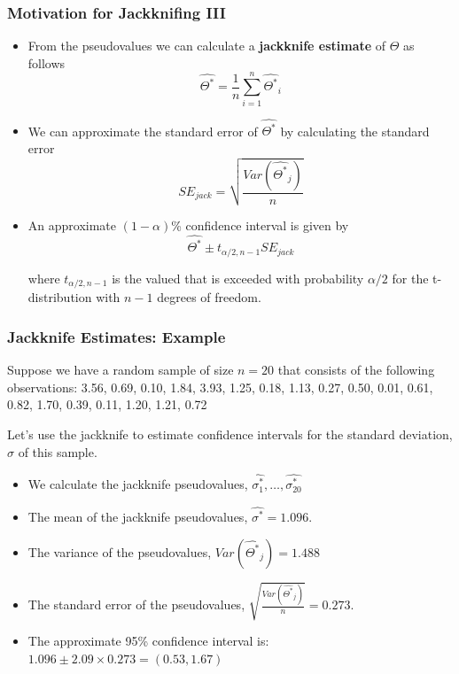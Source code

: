 \documentclass{beamer}
\begin{document}
\begin{frame}
  \frametitle{Motivation for Jackknifing III}

\begin{itemize}
    \item From the pseudovalues we can calculate a \textbf{jackknife estimate} of $\Theta$ as follows
\[
\widehat{\Theta^*} = \frac{1}{n} \sum_{i=1}^{n}\widehat{\Theta^*}_i
\]

    \item We can approximate the standard error of $\widehat{\Theta^*}$ by calculating the standard error
\[
SE_{jack} = \sqrt{\frac{Var(\widehat{\Theta^*}_j)}{n}}
\]


    \item An approximate $(1-\alpha)$\% confidence interval is given by
\[
\widehat{\Theta^*} \pm t_{\alpha/2, n-1} SE_{jack}
\]

where $t_{\alpha/2, n-1}$ is the valued that is exceeded with probability $\alpha/2$ for the t-distribution with $n-1$ degrees of freedom.

\end{itemize}

\end{frame}

\begin{frame}
  \frametitle{Jackknife Estimates: Example}

Suppose we have a random sample of size $n=20$ that consists of the following observations: 3.56, 0.69, 0.10, 1.84, 3.93, 1.25, 0.18, 1.13, 0.27, 0.50, 0.01, 0.61, 0.82, 1.70, 0.39, 0.11, 1.20, 1.21, 0.72
\medskip

Let's use the jackknife to estimate confidence intervals for the standard deviation, $\sigma$ of this sample.

\begin{itemize}
    \item We calculate the jackknife pseudovalues, $\widehat{\sigma^*_1}, \ldots, \widehat{\sigma^*_{20}}$
    \item The mean of the jackknife pseudovalues, $\widehat{\sigma^*} = 1.096$.
    \item The variance of the pseudovalues, $Var(\widehat{\Theta^*}_j) = 1.488$
    \item The standard error of the pseudovalues, $\sqrt{\frac{Var(\widehat{\Theta^*}_j)}{n}} = 0.273$.
    \item The approximate 95\% confidence interval is: $1.096 \pm 2.09 \times 0.273 = (0.53, 1.67)$

\end{itemize}



\end{frame}
\end{document}
